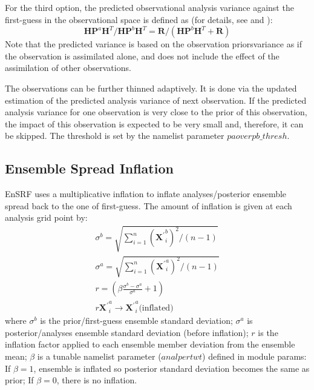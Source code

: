 For the third option, the predicted observational analysis variance against the first-guess in the observational space is defined as (for details, see \cite{Whitaker2008} and \cite{Whitaker2012}):
\begin{equation}
\pmb{HP}^{a}\pmb{H}^{T} / \pmb{HP}^{b}\pmb{H}^{T} = \pmb{R}/(\pmb{HP}^{b}\pmb{H}^{T} + \pmb{R})
\end{equation}
Note that the predicted variance is based on the observation priors\textquotesingle variance as if the observation is assimilated alone, and does not include the effect of the assimilation of other observations.

The observations can be further thinned adaptively. It is done via the updated estimation of the predicted analysis variance of next observation. If the predicted analysis variance for one observation is very close to the prior of this observation, the impact of this observation is expected to be very small and, therefore, it can be skipped. The threshold is set by the namelist parameter ${paoverpb\_thresh}$.


   \subsection{Ensemble Spread Inflation}
EnSRF uses a multiplicative inflation to inflate analyses/posterior ensemble spread back to the one of first-guess. The amount of inflation is given at each analysis grid point by:
\begin{eqnarray}
\sigma^b = \sqrt{\sum_{i=1}^{n} (\pmb{X^\prime}_i^b)^2/(n-1) } \nonumber  \\
\sigma^a = \sqrt{\sum_{i=1}^{n} (\pmb{X^\prime}_i^a)^2/(n-1) } \nonumber   \\
r = \left( \beta \frac{\sigma^b-\sigma^a}{\sigma^a} +1 \right)  \\
r\mathbf{X^\prime}_i^a \rightarrow \mathbf{X^\prime}_i^a \text{(inflated)} \nonumber
\end{eqnarray}
where $\sigma^b$ is the prior/first-guess ensemble standard deviation;
$\sigma^a$ is posterior/analyses ensemble standard deviation (before inflation);
$r$ is the inflation factor applied to each ensemble member deviation from the ensemble mean;
$\beta$ is a tunable namelist parameter ($analpertwt$) defined in module params: If $\beta=1$, ensemble is inflated so posterior standard deviation becomes the same as prior; If $\beta=0$, there is no inflation.

